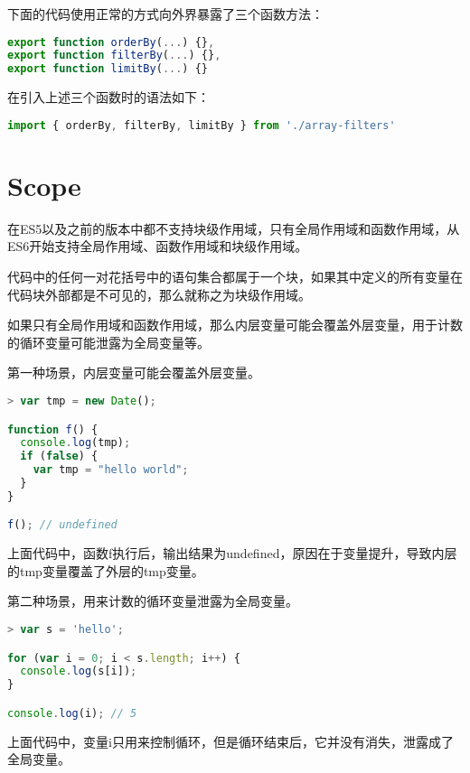 下面的代码使用正常的方式向外界暴露了三个函数方法：

\begin{lstlisting}[language=JavaScript]
export function orderBy(...) {},
export function filterBy(...) {},
export function limitBy(...) {}
\end{lstlisting}

在引入上述三个函数时的语法如下：



\begin{lstlisting}[language=JavaScript]
import { orderBy, filterBy, limitBy } from './array-filters'
\end{lstlisting}



\chapter{Scope}

在ES5以及之前的版本中都不支持块级作用域，只有全局作用域和函数作用域，从ES6开始支持全局作用域、函数作用域和块级作用域。



代码中的任何一对花括号中的语句集合都属于一个块，如果其中定义的所有变量在代码块外部都是不可见的，那么就称之为块级作用域。

如果只有全局作用域和函数作用域，那么内层变量可能会覆盖外层变量，用于计数的循环变量可能泄露为全局变量等。

第一种场景，内层变量可能会覆盖外层变量。



\begin{lstlisting}[language=JavaScript]
> var tmp = new Date();

function f() {
  console.log(tmp);
  if (false) {
    var tmp = "hello world";
  }
}

f(); // undefined
\end{lstlisting}

上面代码中，函数f执行后，输出结果为undefined，原因在于变量提升，导致内层的tmp变量覆盖了外层的tmp变量。

第二种场景，用来计数的循环变量泄露为全局变量。

\begin{lstlisting}[language=JavaScript]
> var s = 'hello';

for (var i = 0; i < s.length; i++) {
  console.log(s[i]);
}

console.log(i); // 5
\end{lstlisting}

上面代码中，变量i只用来控制循环，但是循环结束后，它并没有消失，泄露成了全局变量。

